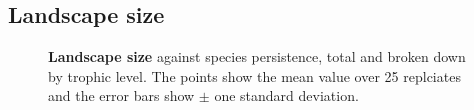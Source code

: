 \clearpage
\subsection{Landscape size}
\label{sec:lsvp}

% 

\begin{figure}
	\centering	
	\renewcommand{\thesubfigure}{}
	\setlength{\subfloatlabelskip}{0pt}
	\caption{\textbf{Landscape size} against species persistence, total and broken down by trophic level. The points show the mean value over 25 replciates and the error bars show $\pm$ one standard deviation.}
	\label{fig:ls_v_comp}
\end{figure}

